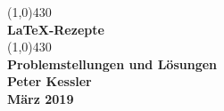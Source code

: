 \begin{center}
  \vspace*{5.5cm}
  \line(1,0){430}\\
  [8mm]
  \Huge \textbf{\LaTeX-Rezepte} \\
  [2mm]
  \line(1,0){430}\\
  \vspace{1.5cm}
  \LARGE\textbf{Problemstellungen und Lösungen}\\
  \vspace{1.5cm}
  \Large\textbf{Peter Kessler}\\  
  \Large\textbf{März 2019}\\  
  \vfill
\end{center}
